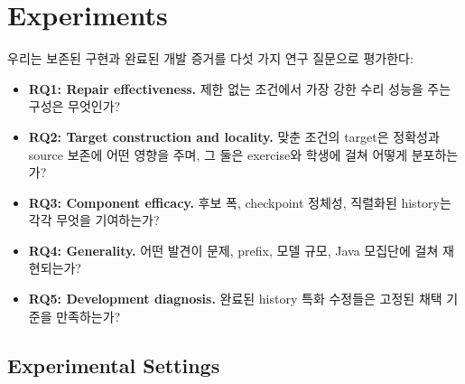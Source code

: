 \documentclass[10pt,conference]{IEEEtran}
\begin{document}
\section{Experiments}
\label{sec:experiment}
우리는 보존된 구현과 완료된 개발 증거를 다섯 가지 연구 질문으로 평가한다:
\begin{itemize}
\item \textbf{RQ1: Repair effectiveness.} 제한 없는 조건에서 가장 강한 수리 성능을 주는 구성은 무엇인가?
\item \textbf{RQ2: Target construction and locality.} 맞춘 조건의 target은 정확성과 source 보존에 어떤 영향을 주며, 그 둘은 exercise와 학생에 걸쳐 어떻게 분포하는가?
\item \textbf{RQ3: Component efficacy.} 후보 폭, checkpoint 정체성, 직렬화된 history는 각각 무엇을 기여하는가?
\item \textbf{RQ4: Generality.} 어떤 발견이 문제, prefix, 모델 규모, Java 모집단에 걸쳐 재현되는가?
\item \textbf{RQ5: Development diagnosis.} 완료된 history 특화 수정들은 고정된 채택 기준을 만족하는가?
\end{itemize}

\subsection{Experimental Settings}
\end{document}
